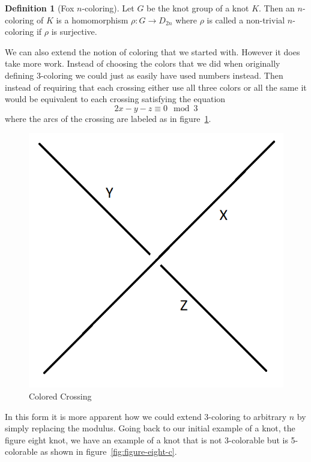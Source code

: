 \documentclass[12pt]{amsart}
\theoremstyle{definition}
\newtheorem{definition}[theorem]{Definition}
\theoremstyle{remark}
\numberwithin{equation}{section}
\newcommand{\ds}{.3}
\begin{document}
\begin{definition}[Fox $n$-coloring]
  Let $G$ be the knot group of a knot $K$. Then
  an $n$-coloring of $K$ is a homomorphism $\rho: G\rightarrow D_{2n}$
  where $\rho$ is called a non-trivial $n$-coloring if $\rho$ is
  surjective.
\end{definition}

We can also extend the notion of coloring that we started
with. However it does take more work. Instead of choosing
the colors that we did when originally defining 3-coloring
we could just as easily have used numbers instead. Then
instead of requiring that each crossing either use all three
colors or all the same it would be equivalent to each
crossing satisfying the equation
\[
  2x-y-z\equiv 0 \mod 3
\]
where the arcs of the crossing are labeled as in figure~\ref{fig:numcolor}.

\begin{figure}
  \includegraphics[scale=\ds]{numcolor}
  \caption{Colored Crossing}
  \label{fig:numcolor}
\end{figure}

In this form it is more apparent how we could extend 3-coloring
to arbitrary $n$ by simply replacing the modulus. Going back
to our initial example of a knot, the figure eight knot, we have
an example of a knot that is not 3-colorable but is 5-colorable
as shown in figure~\ref{fig:figure-eight-c}.
\end{document}
